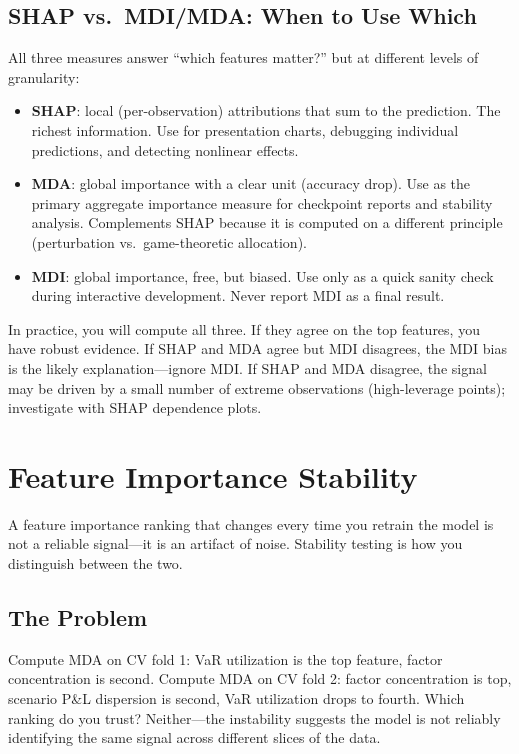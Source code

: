\subsection{SHAP vs.\ MDI/MDA: When to Use Which}

All three measures answer ``which features matter?'' but at different levels of granularity:
\begin{itemize}[nosep]
  \item \textbf{SHAP}: local (per-observation) attributions that sum to the prediction. The richest information. Use for presentation charts, debugging individual predictions, and detecting nonlinear effects.
  \item \textbf{MDA}: global importance with a clear unit (accuracy drop). Use as the primary aggregate importance measure for checkpoint reports and stability analysis. Complements SHAP because it is computed on a different principle (perturbation vs.\ game-theoretic allocation).
  \item \textbf{MDI}: global importance, free, but biased. Use only as a quick sanity check during interactive development. Never report MDI as a final result.
\end{itemize}

In practice, you will compute all three.
If they agree on the top features, you have robust evidence.
If SHAP and MDA agree but MDI disagrees, the MDI bias is the likely explanation---ignore MDI.
If SHAP and MDA disagree, the signal may be driven by a small number of extreme observations (high-leverage points); investigate with SHAP dependence plots.

\section{Feature Importance Stability}
\label{sec:importance-stability}

A feature importance ranking that changes every time you retrain the model is not a reliable signal---it is an artifact of noise.
Stability testing is how you distinguish between the two.

\subsection{The Problem}

Compute MDA on CV fold 1: VaR utilization is the top feature, factor concentration is second.
Compute MDA on CV fold 2: factor concentration is top, scenario P\&L dispersion is second, VaR utilization drops to fourth.
Which ranking do you trust?
Neither---the instability suggests the model is not reliably identifying the same signal across different slices of the data.

